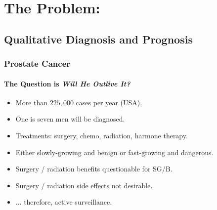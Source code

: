 \section{The Problem:}
\subsection{Qualitative Diagnosis and Prognosis}



\begin{frame}
\frametitle{Prostate Cancer}
\framesubtitle{The Question is \emph{Will He Outlive It?}}


    \begin{block}{}
        \begin{itemize}
            \item More than $225,000$ cases per year (USA).
            \item One is seven men will be diagnosed.
            \item Treatments: surgery, chemo, radiation, harmone therapy.
            \item Either slowly-growing  and benign or fast-growing
                and dangerous.
            \item Surgery / radiation benefits questionable for SG/B.
            \item Surgery / radiation side effects not desirable.
            \item ... therefore, active surveillance.
        \end{itemize}
    \end{block}

\end{frame}

